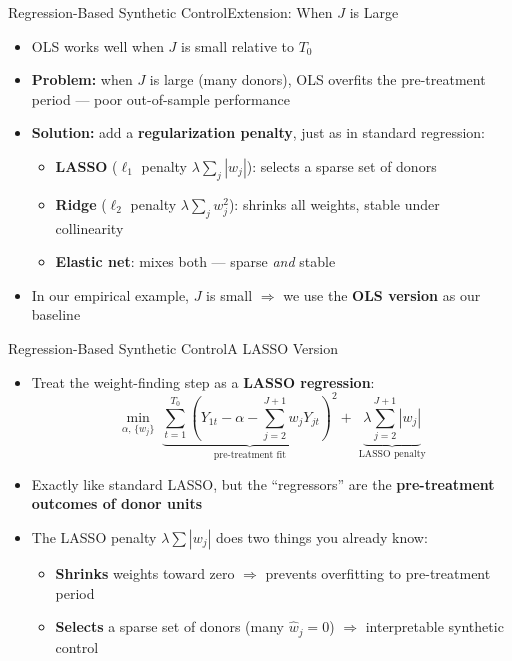 \documentclass[hyperref={pdfpagelabels=false}]{beamer}
\begin{document}
\begin{frame}{Regression-Based Synthetic Control}{Extension: When $J$ is Large}
\begin{itemize}
	\item OLS works well when $J$ is small relative to $T_0$
	\vspace{0.2cm}
	\item \textbf{Problem:} when $J$ is large (many donors), OLS overfits the pre-treatment period --- poor out-of-sample performance
	\vspace{0.2cm}
	\item \textbf{Solution:} add a \textbf{regularization penalty}, just as in standard regression:
	\vspace{0.1cm}
	\begin{itemize}
		\item \textbf{LASSO} ($\ell_1$ penalty $\lambda\sum_j|w_j|$): selects a sparse set of donors
		\vspace{0.1cm}
		\item \textbf{Ridge} ($\ell_2$ penalty $\lambda\sum_j w_j^2$): shrinks all weights, stable under collinearity
		\vspace{0.1cm}
		\item \textbf{Elastic net}: mixes both --- sparse \emph{and} stable
	\end{itemize}
	\vspace{0.2cm}
	\item In our empirical example, $J$ is small $\Rightarrow$ we use the \textbf{OLS version} as our baseline
\end{itemize}
\end{frame}


\begin{frame}{Regression-Based Synthetic Control}{A LASSO Version}
\begin{itemize}
	\item Treat the weight-finding step as a \textbf{LASSO regression}:
	\begin{equation*}
		\min_{\alpha,\,\{w_j\}}\;
		\underbrace{\sum_{t=1}^{T_0}\!\left(Y_{1t} - \alpha - \sum_{j=2}^{J+1}w_j Y_{jt}\right)^{\!2}}_{\text{pre-treatment fit}}
		+\;
		\underbrace{\lambda\sum_{j=2}^{J+1}|w_j|}_{\text{LASSO penalty}}
	\end{equation*}
	\vspace{0.2cm}
	\item Exactly like standard LASSO, but the ``regressors'' are the \textbf{pre-treatment outcomes of donor units}
	\vspace{0.3cm}
	\item The LASSO penalty $\lambda\sum|w_j|$ does two things you already know:
	\vspace{0.1cm}
	\begin{itemize}
		\item \textbf{Shrinks} weights toward zero $\Rightarrow$ prevents overfitting to pre-treatment period
		\vspace{0.1cm}
		\item \textbf{Selects} a sparse set of donors (many $\hat{w}_j = 0$) $\Rightarrow$ interpretable synthetic control
	\end{itemize}
\end{itemize}
\end{frame}
\end{document}
